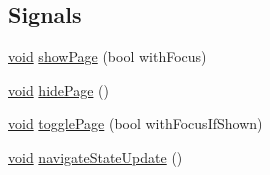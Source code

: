 \subsection*{Signals}
\begin{DoxyCompactItemize}
\item 
\hyperlink{group___u_a_v_objects_plugin_ga444cf2ff3f0ecbe028adce838d373f5c}{void} \hyperlink{group___core_plugin_ga5ddca3c2d6c7c1696aaa9d21a297d75e}{show\-Page} (bool with\-Focus)
\item 
\hyperlink{group___u_a_v_objects_plugin_ga444cf2ff3f0ecbe028adce838d373f5c}{void} \hyperlink{group___core_plugin_gab17c1ab24f6ff4a8e32da73dd6f3a709}{hide\-Page} ()
\item 
\hyperlink{group___u_a_v_objects_plugin_ga444cf2ff3f0ecbe028adce838d373f5c}{void} \hyperlink{group___core_plugin_gaa737406ffca155e80dc1af7ee3ff1cdd}{toggle\-Page} (bool with\-Focus\-If\-Shown)
\item 
\hyperlink{group___u_a_v_objects_plugin_ga444cf2ff3f0ecbe028adce838d373f5c}{void} \hyperlink{group___core_plugin_gad0071aa500a2af9ac99b389a357a3c7f}{navigate\-State\-Update} ()
\end{DoxyCompactItemize}
